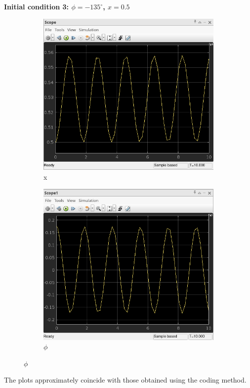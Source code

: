 \documentclass{article}
\begin{document}
\textbf{Initial condition 3: $\phi = -135^\circ$, $x = 0.5$}

\begin{figure}[htbp]
  \centering
  \begin{subfigure}[t]{0.45\linewidth}
    \centering
    \includegraphics[width=\linewidth]{simulink/init1_x.png}
    \caption{x}
  \end{subfigure}
  \begin{subfigure}[t]{0.45\linewidth}
    \centering
    \includegraphics[width=\linewidth]{simulink/init1_phi.png}
    \caption{$\phi$}
  \end{subfigure}
\end{figure}

The plots approximately coincide with those obtained using the coding method.
\end{document}
